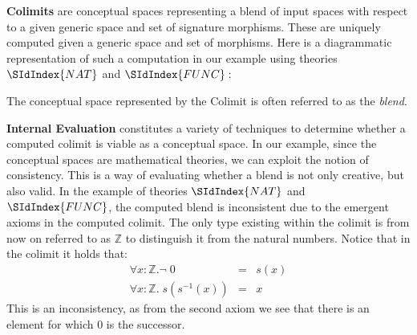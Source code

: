 {\bf Colimits} are conceptual spaces representing a blend of input
spaces with respect to a given generic space and set of signature
morphisms. These are uniquely computed given a generic space and set of
morphisms. Here is a diagrammatic representation of such a computation
in our example using theories $\SIdIndex{NAT}$ and $\SIdIndex{FUNC}:$
\begin{center}
\end{center}
The conceptual space represented by the Colimit is often referred to
as the {\em blend}. 

{\bf Internal Evaluation} constitutes a variety of techniques to determine whether a computed colimit is viable as a conceptual space. In our example, since the conceptual spaces are mathematical theories, we can exploit the notion of consistency. This is a way of evaluating whether a
blend is not only creative, but also valid. In the example of theories
$\SIdIndex{NAT}$ and $\SIdIndex{FUNC}$,
the computed blend is inconsistent due to the emergent axioms in the
computed colimit. The only type existing within the colimit is from now
on referred to as $\mathbb{Z}$ to distinguish it from the natural
numbers. Notice that in the colimit it holds that:
\begin{eqnarray*}
\forall x: \mathbb{Z}. \neg\; 0 &=&s(x)\\
\forall x:\mathbb{Z}.\;s(s^{-1}( x)) &=& x
\end{eqnarray*}
This is an inconsistency, as from the second axiom we see 
that there is an
element for which 0 is the successor.

